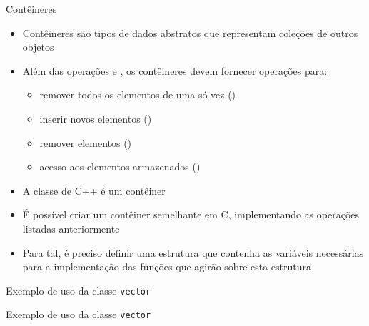 \begin{frame}[fragile]{Contêineres}

	\begin{itemize}

		\item Contêineres são tipos de dados abstratos que representam coleções de outros objetos

        \item Além das operações  e , os contêineres devem fornecer 
        operações para:
		\begin{itemize}
			\item remover todos os elementos de uma só vez ()
			\item inserir novos elementos ()
			\item remover elementos ()
			\item acesso aos elementos armazenados ()
		\end{itemize}

		\item A classe  de C++ é um contêiner

		\item É possível criar um contêiner semelhante em C, implementando as operações listadas 
		anteriormente

		\item Para tal, é preciso definir uma estrutura que contenha as variáveis necessárias para 
        a implementação das funções que agirão sobre esta estrutura
	\end{itemize}

\end{frame}

\begin{frame}[fragile]{Exemplo de uso da classe \texttt{vector}}
\end{frame}

\begin{frame}[fragile]{Exemplo de uso da classe \texttt{vector}}
\end{frame}
